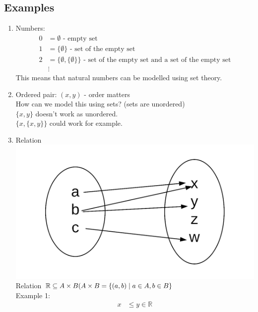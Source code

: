 \documentclass[a4paper,12pt]{article}
\begin{document}
\subsection*{Examples}
\begin{enumerate}
	\item Numbers:
	\begin{align*}
	0 & = \emptyset \text{ - empty set} \\
	1 & = \{\emptyset\} \text{ - set of the empty set} \\
	2 & = \{\emptyset, \{ \emptyset \}\} \text{ - set of the empty set and a set of the empty set} \\
	& \vdots 
	\end{align*}
	This means that natural numbers can be modelled using set theory. 
	\item Ordered pair: $(x, y)$ - order matters \\
	How can we model this using sets? (sets are unordered) \\
	$\{x,y\}$ doesn't work as unordered. \\
	$\{x, \{x,y\}\}$ could work for example. \\
	\item Relation \\
	\includegraphics[scale=0.15]{fig1} \\
	Relation $\mathbb{R} \subseteq A \times B \\ ( A \times B = \{(a,b)\;|\; a \in A, b \in B \}$ \\
	Example 1:
	\begin{align*}
		x & \leqslant y \in \mathbb{R} \\

\end{align*}
\end{enumerate}
\end{document}
